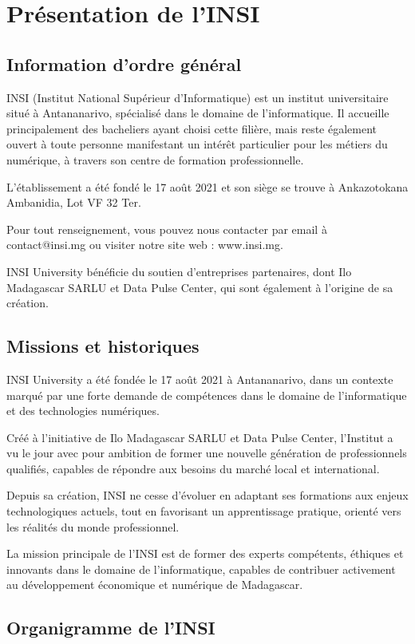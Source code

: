 \documentclass[a4paper,12pt]{book}
\begin{document}
\chapter{Présentation de l'INSI}
\section{Information d'ordre général}

INSI (Institut National Supérieur d'Informatique) est un institut universitaire situé à Antananarivo, spécialisé dans le domaine de l'informatique. Il accueille principalement des bacheliers ayant choisi cette filière, mais reste également ouvert à toute personne manifestant un intérêt particulier pour les métiers du numérique, à travers son centre de formation professionnelle.

L'établissement a été fondé le 17 août 2021 et son siège se trouve à Ankazotokana Ambanidia, Lot VF 32 Ter.

Pour tout renseignement, vous pouvez nous contacter par email à contact@insi.mg ou visiter notre site web : www.insi.mg.

INSI University bénéficie du soutien d'entreprises partenaires, dont Ilo Madagascar SARLU et Data Pulse Center, qui sont également à l'origine de sa création.
\section{Missions et historiques}

INSI University a été fondée le 17 août 2021 à Antananarivo, dans un contexte marqué par une forte demande de compétences dans le domaine de l'informatique et des technologies numériques.

Créé à l'initiative de Ilo Madagascar SARLU et Data Pulse Center, l'Institut a vu le jour avec pour ambition de former une nouvelle génération de professionnels qualifiés, capables de répondre aux besoins du marché local et international.

Depuis sa création, INSI ne cesse d'évoluer en adaptant ses formations aux enjeux technologiques actuels, tout en favorisant un apprentissage pratique, orienté vers les réalités du monde professionnel.

La mission principale de l'INSI est de former des experts compétents, éthiques et innovants dans le domaine de l'informatique, capables de contribuer activement au développement économique et numérique de Madagascar.

\section{Organigramme de l'INSI}
\end{document}
